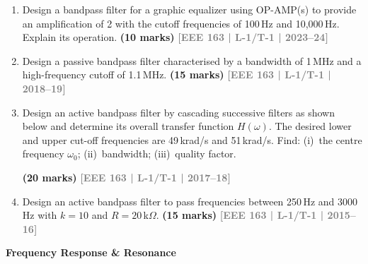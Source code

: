 \documentclass[12pt,a3paper]{article}
\newcommand{\yr}[1]{\hfill\textcolor{gray}{\small\textbf{[#1]}}}
\newcommand{\mk}[1]{\textcolor{orange!70!black}{\small\textbf{(#1 marks)}}}
\newcommand{\subtopic}[2]{%
  \vspace{10pt}
  \noindent\begin{tcolorbox}[colback=#1!8,colframe=#1,boxrule=0.6pt,arc=4pt,
    left=6pt,right=6pt,top=4pt,bottom=4pt]
    \small\bfseries\textcolor{#1}{#2}
  \end{tcolorbox}
  \vspace{2pt}
}
\begin{document}
\begin{enumerate}\item Design a bandpass filter for a graphic equalizer using OP-AMP(s) to provide an amplification of 2 with the cutoff frequencies of 100\,Hz and 10{,}000\,Hz. Explain its operation.
\mk{10} \yr{EEE 163 | L-1/T-1 | 2023--24}

\item Design a passive bandpass filter characterised by a bandwidth of 1\,MHz and a high-frequency cutoff of 1.1\,MHz.
\mk{15} \yr{EEE 163 | L-1/T-1 | 2018--19}

\item Design an active bandpass filter by cascading successive filters as shown below and determine its overall transfer function $H(\omega)$. The desired lower and upper cut-off frequencies are 49\,krad/s and 51\,krad/s. Find: (i)~the centre frequency $\omega_0$; (ii)~bandwidth; (iii)~quality factor.
\begin{center}
\end{center}
\mk{20} \yr{EEE 163 | L-1/T-1 | 2017--18}

\item Design an active bandpass filter to pass frequencies between 250\,Hz and 3000\,Hz with $k = 10$ and $R = 20$\,k$\Omega$.
\mk{15} \yr{EEE 163 | L-1/T-1 | 2015--16}

\end{enumerate}

\subtopic{cE}{Frequency Response \& Resonance}
\label{sub:s4-resonance}
\end{document}
